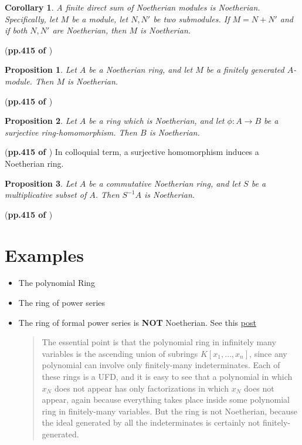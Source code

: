 \documentclass{article}
\numberwithin{equation}{subsection} %
\newtheorem{prop}{Proposition}[section]
\newtheorem{coro}{Corollary}[section]
\theoremstyle{definition}
\begin{document}
\begin{coro}
    \label{coro:Noetherian.1.3}
    A finite direct sum of Noetherian modules is Noetherian. Specifically,
    let $M$ be a module, let $N,N'$ be two submodules. If $M=N+N'$ and if
    both $N,N'$ are Noetherian, then $M$ is Noetherian.
\end{coro}
(\textbf{pp.415 of \cite{lang}})
\begin{prop}
    \label{prop:Noetherian.1.4}
    Let $A$ be a Noetherian ring, and let $M$ be a finitely generated
    $A$-module. Then $M$ is Noetherian.
\end{prop}
(\textbf{pp.415 of \cite{lang}})
\begin{prop}
    \label{prop:Noetherian.1.5}
    Let $A$ be a ring which is Noetherian, and let $\phi:A\to B$ be
    a surjective ring-homomorphism. Then $B$ is Noetherian.
\end{prop}
(\textbf{pp.415 of \cite{lang}})
In colloquial term, a surjective homomorphism induces a Noetherian ring.
\begin{prop}
    \label{prop:Noetherian.1.6}
    Let $A$ be a commutative Noetherian ring, and let $S$ be a
    multiplicative subset of $A$. Then $S^{-1}A$ is Noetherian.
\end{prop}
(\textbf{pp.415 of \cite{lang}})
\section{Examples}
\label{sec:Examples}
\begin{itemize}
    \item The polynomial Ring
    \item The ring of power series
    \item The ring of formal power series is \textbf{NOT} Noetherian.
        See this \href{http://math.stackexchange.com/questions/281597/an-example-of-a-non-noetherian-ufd}{post}
        \begin{quote}
        The essential point is that the polynomial ring in infinitely many variables is the ascending union of subrings $K[x_1,\ldots,x_n]$, since any polynomial can involve only finitely-many indeterminates. Each of these rings is a UFD, and it is easy to see that a polynomial in which $x_N$ does not appear has only factorizations in which $x_N$ does not appear, again because everything takes place inside some polynomial ring in finitely-many variables. But the ring is not Noetherian, because the ideal generated by all the indeterminates is certainly not finitely-generated.
        \end{quote}
\end{itemize}
\end{document}
